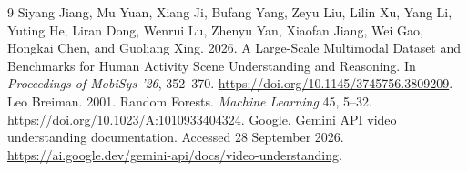 \documentclass[12pt,a4paper]{article}
\begin{document}
\begin{thebibliography}{9}
 Siyang Jiang, Mu Yuan, Xiang Ji, Bufang Yang, Zeyu Liu, Lilin Xu, Yang Li, Yuting He, Liran Dong, Wenrui Lu, Zhenyu Yan, Xiaofan Jiang, Wei Gao, Hongkai Chen, and Guoliang Xing. 2026. A Large-Scale Multimodal Dataset and Benchmarks for Human Activity Scene Understanding and Reasoning. In \emph{Proceedings of MobiSys '26}, 352--370. \url{https://doi.org/10.1145/3745756.3809209}.
 Leo Breiman. 2001. Random Forests. \emph{Machine Learning} 45, 5--32. \url{https://doi.org/10.1023/A:1010933404324}.
 Google. Gemini API video understanding documentation. Accessed 28 September 2026. \url{https://ai.google.dev/gemini-api/docs/video-understanding}.
\end{thebibliography}
\end{document}
